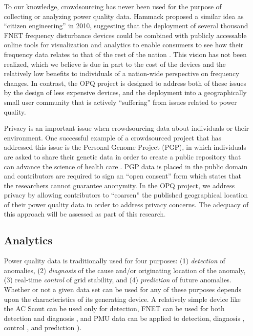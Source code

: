 To our knowledge, crowdsourcing has never been used for the purpose of collecting or analyzing power quality data.  Hammack proposed a similar idea as ``citizen engineering'' in 2010, suggesting that the deployment of several thousand FNET frequency disturbance devices could be combined with publicly accessable online tools for visualization and analytics to enable consumers to see how their frequency data relates to that of the rest of the nation \cite{Hammack2010}.   This vision has not been realized, which we believe is due in part to the cost of the devices and the relatively low benefits to individuals of a nation-wide perspective on frequency changes.  In contrast, the OPQ project is designed to address both of these issues by the design of less expensive devices, and the deployment into a geographically small user community that is actively ``suffering'' from issues related to power quality.  

Privacy is an important issue when crowdsourcing data about individuals or their environment. One successful example of a crowdsourced project that has addressed this issue is the Personal Genome Project (PGP), in which individuals are asked to share their genetic data in order to create a public repository that can advance the science of health care \cite{Church2005}. PGP data is placed in the public domain and contributors are required to sign an ``open consent'' form which states that the researchers cannot guarantee anonymity. In the OPQ project, we address privacy by allowing contributors to ``coarsen'' the published geographical location of their power quality data in order to address privacy concerns.  The adequacy of this approach will be assessed as part of this research.

\subsection{Analytics}

Power quality data is traditionally used for four purposes: (1) {\em detection} of anomalies, (2) {\em diagnosis} of the cause and/or originating location of the anomaly, (3) real-time {\em control} of grid stability, and (4) {\em prediction} of future anomalies. Whether or not a given data set can be used for any of these purposes depends upon the characteristics of its generating device. A relatively simple device like the AC Scout can be used only for detection, FNET can be used for both detection and diagnosis \cite{Markham2012}, and PMU data can be applied to detection, diagnosis \cite{Zhao2009}, control \cite{Liu2010}, and prediction \cite{Liu2009,Gao2012}). 

